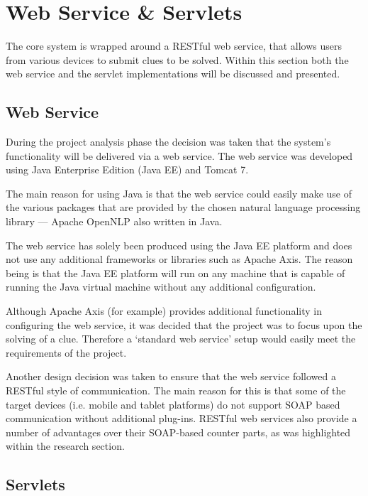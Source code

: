 \section{Web Service \& Servlets}
\label{sec:servlet}

The core system is wrapped around a RESTful web service, that allows users from
various devices to submit clues to be solved. Within this section both the web 
service and the servlet implementations will be discussed and presented.


\subsection{Web Service}
\label{sub:servlet_web_service}

During the project analysis phase the decision was taken that the system's
functionality will be delivered via a web service. The web service was developed
using Java Enterprise Edition (Java EE) and Tomcat 7.

The main reason for using Java is that the web service could easily make use of
the various packages that are provided by the chosen natural language processing
library --- Apache OpenNLP also written in Java.

The web service has solely been produced using the Java EE platform and does not
use any additional frameworks or libraries such as Apache Axis. The reason being
is that the Java EE platform will run on any machine that is capable of running
the Java virtual machine without any additional configuration.

Although Apache Axis (for example) provides additional functionality in
configuring the web service, it was decided that the project was to focus upon
the solving of a clue. Therefore a `standard web service' setup would easily
meet the requirements of the project.

Another design decision was taken to ensure that the web service followed a
RESTful style of communication. The main reason for this is that some of the
target devices (i.e. mobile and tablet platforms) do not support SOAP based
communication without additional plug-ins. RESTful web services also provide a
number of advantages over their SOAP-based counter parts, as was highlighted
within the research section.


\subsection{Servlets}
\label{sub:servlet_servlets}

